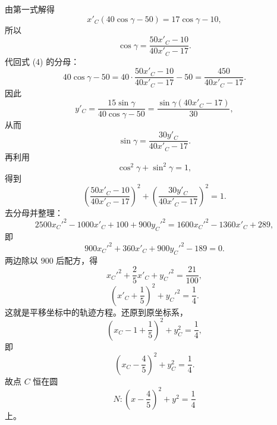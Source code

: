 \begin{solution}
由第一式解得
\[
x'_C(40\cos\gamma-50)=17\cos\gamma-10,
\]
所以
\[
\cos\gamma=\frac{50x'_C-10}{40x'_C-17}.
\]
代回式 (4) 的分母：
\[
40\cos\gamma-50
=40\cdot\frac{50x'_C-10}{40x'_C-17}-50
=\frac{450}{40x'_C-17}.
\]
因此
\[
y'_C=\frac{15\sin\gamma}{40\cos\gamma-50}
=\frac{\sin\gamma(40x'_C-17)}{30},
\]
从而
\[
\sin\gamma=\frac{30y'_C}{40x'_C-17}.
\]
再利用
\[
\cos^2\gamma+\sin^2\gamma=1,
\]
得到
\[
\left(\frac{50x'_C-10}{40x'_C-17}\right)^2
+\left(\frac{30y'_C}{40x'_C-17}\right)^2=1.
\]
去分母并整理：
\[
2500x_C'^2-1000x'_C+100+900y_C'^2
=1600x_C'^2-1360x'_C+289,
\]
即
\[
900x_C'^2+360x'_C+900y_C'^2-189=0.
\]
两边除以 $900$ 后配方，得
\[
x_C'^2+\frac25x'_C+y_C'^2=\frac{21}{100},
\]
\[
\left(x'_C+\frac15\right)^2+y_C'^2=\frac14.
\]
这就是平移坐标中的轨迹方程。还原到原坐标系，
\[
\left(x_C-1+\frac15\right)^2+y_C^2=\frac14,
\]
即
\[
\left(x_C-\frac45\right)^2+y_C^2=\frac14.
\]
故点 $C$ 恒在圆
\[
N:\left(x-\frac45\right)^2+y^2=\frac14
\]
上。
\end{solution}

